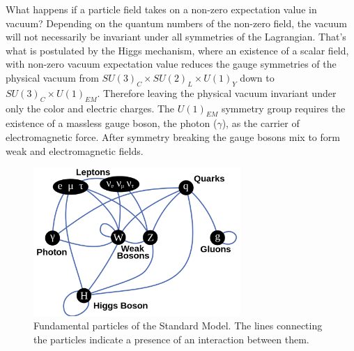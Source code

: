 What happens if a particle field takes on a non-zero expectation value in vacuum? Depending on the
quantum numbers of the non-zero field, the vacuum will not necessarily be invariant under
all symmetries of the Lagrangian. That's what is postulated by the Higgs mechanism, where
an existence of a scalar field, with non-zero vacuum expectation value
reduces the gauge symmetries of the physical 
vacuum from $SU(3)_C \times SU(2)_L \times U(1)_Y$
down to $SU(3)_C \times U(1)_{EM}$. Therefore leaving the physical vacuum invariant under
only the color and electric charges. 
The $U(1)_{EM}$ symmetry group requires the existence of a massless
gauge boson, the photon ($\gamma$), as the carrier of electromagnetic force.
After symmetry breaking the gauge bosons mix to form weak and electromagnetic fields.



\begin{figure}[htbp]
\centering
\includegraphics[width=0.7\textwidth]{plots/intro/eleparticles.png}
\caption{Fundamental particles of the Standard Model. The lines connecting the particles
indicate a presence of an interaction between them. \label{fig:eleparticles}}
\end{figure}

